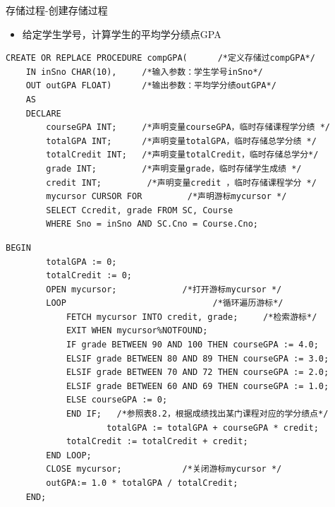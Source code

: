 \begin{frame}{存储过程-创建存储过程}
\begin{itemize}
    \item 给定学生学号，计算学生的平均学分绩点GPA
\end{itemize}
\begin{block}{}
\begin{lstlisting}[linewidth=\textwidth]
CREATE OR REPLACE PROCEDURE compGPA(      /*定义存储过compGPA*/
    IN inSno CHAR(10),     /*输入参数：学生学号inSno*/
    OUT outGPA FLOAT)      /*输出参数：平均学分绩outGPA*/
    AS 
    DECLARE
        courseGPA INT;     /*声明变量courseGPA，临时存储课程学分绩 */
        totalGPA INT;      /*声明变量totalGPA，临时存储总学分绩 */
        totalCredit INT;   /*声明变量totalCredit，临时存储总学分*/
        grade INT;         /*声明变量grade，临时存储学生成绩 */
        credit INT;         /*声明变量credit ，临时存储课程学分 */
        mycursor CURSOR FOR         /*声明游标mycursor */ 
        SELECT Ccredit, grade FROM SC, Course 
        WHERE Sno = inSno AND SC.Cno = Course.Cno;   
\end{lstlisting}
\end{block}
\framebreak
\begin{block}{}
\begin{lstlisting}[firstnumber=15,linewidth=\textwidth]
    BEGIN 
        totalGPA := 0;
        totalCredit := 0;
        OPEN mycursor;             /*打开游标mycursor */
        LOOP                             /*循环遍历游标*/
            FETCH mycursor INTO credit, grade;     /*检索游标*/
            EXIT WHEN mycursor%NOTFOUND;
            IF grade BETWEEN 90 AND 100 THEN courseGPA := 4.0; 
            ELSIF grade BETWEEN 80 AND 89 THEN courseGPA := 3.0; 
            ELSIF grade BETWEEN 70 AND 72 THEN courseGPA := 2.0; 
            ELSIF grade BETWEEN 60 AND 69 THEN courseGPA := 1.0; 
            ELSE courseGPA := 0; 
            END IF;   /*参照表8.2，根据成绩找出某门课程对应的学分绩点*/
                    totalGPA := totalGPA + courseGPA * credit;
            totalCredit := totalCredit + credit;
        END LOOP;
        CLOSE mycursor;            /*关闭游标mycursor */
        outGPA:= 1.0 * totalGPA / totalCredit;
    END;
\end{lstlisting}
\end{block}

\end{frame}


